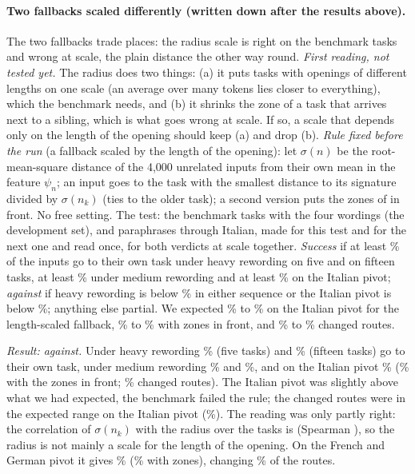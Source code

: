 \paragraph{Two fallbacks scaled differently (written down after the results above).} The two fallbacks trade places: the radius scale is right on the benchmark tasks and wrong at scale, the plain distance the other way round. \emph{First reading, not tested yet.} The radius does two things: (a) it puts tasks with openings of different lengths on one scale
(an average over many tokens lies closer to everything), which the benchmark needs, and (b) it shrinks the zone of a task that arrives next to a sibling, which is what goes wrong at scale. If so, a scale that depends only on the length of the opening should keep (a) and drop (b). \emph{Rule fixed before the run} (a fallback scaled by the length of the opening): let $\sigma(n)$ be the root-mean-square distance of the 4{,}000
unrelated inputs from their own mean in the feature $\psi_n$; an input goes to the task with the smallest distance to its signature divided by $\sigma(n_k)$ (ties to the older task); a second version puts the zones of \cert{} in front. No free setting. The test: the benchmark tasks with the four wordings (the development set), and paraphrases through Italian, made for this test and for the next one and read once, for both verdicts at scale together. \emph{Success} if at least \RerouteLineHeavy{}\% of the inputs
go to their own task under heavy rewording on five and on fifteen tasks, at least \RerouteLineMedium{}\% under medium rewording and at least \RerouteLineItalian{}\% on the Italian pivot; \emph{against} if heavy rewording is below \RerouteLineHeavyAgainst{}\% in either sequence or the Italian pivot is below \RerouteLineItalianAgainst{}\%; anything else partial. We expected \RerouteExpectNormItLow{}\% to \RerouteExpectNormItHigh{}\% on the Italian pivot for the length-scaled fallback, \RerouteExpectCfThreeItLow{}\% to \RerouteExpectCfThreeItHigh{}\% with zones in front, and \RerouteExpectNormChangedLow{}\% to \RerouteExpectNormChangedHigh{}\% changed routes.

\emph{Result: against.} Under heavy rewording \RerouteNormHeavyFive{}\% (five tasks) and \RerouteNormHeavyFifteen{}\% (fifteen tasks) go to their own task, under medium rewording \RerouteNormMediumFive{}\% and \RerouteNormMediumFifteen{}\%, and on the Italian pivot \RerouteNormItOwn{}\% (\RerouteCertThreeItOwn{}\% with the zones in front; \RerouteNormItChanged{}\% changed routes). The Italian pivot was slightly above what we had expected, the benchmark failed the rule; the changed routes were in the expected range on the Italian pivot (\RerouteNormItChanged{}\%). The reading was only partly right: the correlation of $\sigma(n_k)$ with the radius over the \WidenTasksEval{} tasks is \RerouteSigmaCorr{} (Spearman \RerouteSigmaCorrSpearman{}), so the radius is not mainly a scale for the length of the opening. On the French and German pivot it gives \RerouteNormOwnEnd{}\% (\RerouteCertThreeOwnEnd{}\% with zones), changing \RerouteNormChanged{}\% of the routes.

